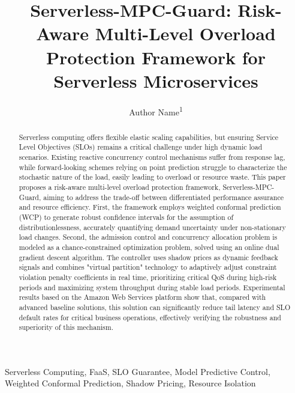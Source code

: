 \documentclass[journal]{IEEEtran}
\begin{document}
\title{Serverless-MPC-Guard: Risk-Aware Multi-Level Overload Protection Framework for Serverless Microservices}

\author{Author Name\textsuperscript{1}
}

\maketitle

\begin{abstract}
Serverless computing offers flexible elastic scaling capabilities, but ensuring Service Level Objectives (SLOs) remains a critical challenge under high dynamic load scenarios. Existing reactive concurrency control mechanisms suffer from response lag, while forward-looking schemes relying on point prediction struggle to characterize the stochastic nature of the load, easily leading to overload or resource waste. This paper proposes a risk-aware multi-level overload protection framework, Serverless-MPC-Guard, aiming to address the trade-off between differentiated performance assurance and resource efficiency. First, the framework employs weighted conformal prediction (WCP) to generate robust confidence intervals for the assumption of distributionlessness, accurately quantifying demand uncertainty under non-stationary load changes. Second, the admission control and concurrency allocation problem is modeled as a chance-constrained optimization problem, solved using an online dual gradient descent algorithm. The controller uses shadow prices as dynamic feedback signals and combines "virtual partition" technology to adaptively adjust constraint violation penalty coefficients in real time, prioritizing critical QoS during high-risk periods and maximizing system throughput during stable load periods. Experimental results based on the Amazon Web Services platform show that, compared with advanced baseline solutions, this solution can significantly reduce tail latency and SLO default rates for critical business operations, effectively verifying the robustness and superiority of this mechanism.
\end{abstract}

\begin{IEEEkeywords}
Serverless Computing, FaaS, SLO Guarantee, Model Predictive Control, Weighted Conformal Prediction, Shadow Pricing, Resource Isolation
\end{IEEEkeywords}
\end{document}

